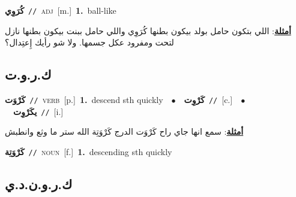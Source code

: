 \documentclass[10pt,a4paper,twoside]{article} %
\begin{document}
\begin{multicols}{2}
{\setlength\topsep{0pt}\textbf{\foreignlanguage{arabic}{كُرَوِي}}\ {\color{gray}\texttt{//}\color{black}}\ \textsc{adj}\ [m.]\ \textbf{1.}~ball-like\  \begin{flushright}\color{gray}\foreignlanguage{arabic}{\textbf{\underline{\foreignlanguage{arabic}{أمثلة}}}: اللي بتكون حامل بولد بيكون بطنها كُرَوِي واللي حامل ببنت بيكون بطنها نازل لتحت ومفرود عكل جسمها. ولا شو رأيك إِعتِدال؟}\end{flushright}\color{black}} \vspace{2mm}

\vspace{-3mm}
\subsection*{\color{blue}\foreignlanguage{arabic}{ك.ر.و.ت}\color{blue}{}} 

{\setlength\topsep{0pt}\textbf{\foreignlanguage{arabic}{كَرْوَت}}\ {\color{gray}\texttt{//}\color{black}}\ \textsc{verb}\ [p.]\ \textbf{1.}~descend sth quickly\ \ $\bullet$\ \ \setlength\topsep{0pt}\textbf{\foreignlanguage{arabic}{كَرْوِت}}\ {\color{gray}\texttt{//}\color{black}}\ [c.]\ \ $\bullet$\ \ \setlength\topsep{0pt}\textbf{\foreignlanguage{arabic}{يكَرْوِت}}\ {\color{gray}\texttt{//}\color{black}}\ [i.]\  \begin{flushright}\color{gray}\foreignlanguage{arabic}{\textbf{\underline{\foreignlanguage{arabic}{أمثلة}}}: سمع انها جاي راح كَرْوَت الدرج كَرْوَتِة الله ستر ما وثع وانطبش}\end{flushright}\color{black}} \vspace{2mm}

{\setlength\topsep{0pt}\textbf{\foreignlanguage{arabic}{كَرْوَتِة}}\ {\color{gray}\texttt{//}\color{black}}\ \textsc{noun}\ [f.]\ \textbf{1.}~descending sth quickly\ } \vspace{2mm}

\vspace{-3mm}
\subsection*{\color{blue}\foreignlanguage{arabic}{ك.ر.و.ن.د.ي}\color{blue}{ (ntws)}} 


\end{multicols}
\end{document}
